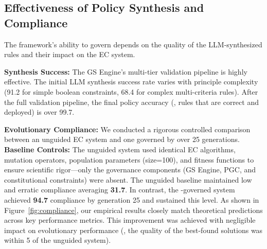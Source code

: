 \subsection{Effectiveness of Policy Synthesis and Compliance}
The framework's ability to govern depends on the quality of the LLM-synthesized rules and their impact on the EC system.

\textbf{Synthesis Success:} The GS Engine's multi-tier validation pipeline is highly effective. The initial LLM synthesis success rate varies with principle complexity (91.2\percent{} for simple boolean constraints, 68.4\percent{} for complex multi-criteria rules). After the full validation pipeline, the final policy accuracy (\ie{}, rules that are correct and deployed) is over 99.7\percent{}.

\textbf{Evolutionary Compliance:} We conducted a rigorous controlled comparison between an unguided EC system and one governed by \acgs{} over 25 generations. \textbf{Baseline Controls:} The unguided system used identical EC algorithms, mutation operators, population parameters (size=100), and fitness functions to ensure scientific rigor—only the \acgs{} governance components (GS Engine, PGC, and constitutional constraints) were absent. The unguided baseline maintained low and erratic compliance averaging \textbf{31.7\percent{}}. In contrast, the \acgs{}-governed system achieved \textbf{94.7\percent{}} compliance by generation 25 and sustained this level. As shown in Figure~\ref{fig:compliance}, our empirical results closely match theoretical predictions across key performance metrics. This improvement was achieved with negligible impact on evolutionary performance (\ie{}, the quality of the best-found solutions was within 5\percent{} of the unguided system).

